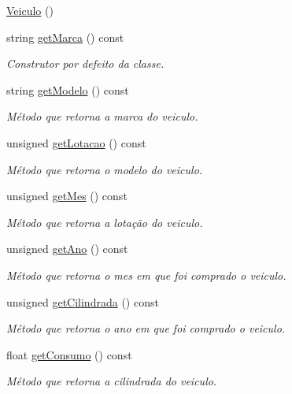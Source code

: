 \begin{DoxyCompactItemize}
\item 
\hyperlink{class_veiculo_aafab27708a2639bc83a4c3721e57d196}{Veiculo} ()
\item 
string \hyperlink{class_veiculo_a2a9d144f41694ea56a33f20a1c97f80b}{get\+Marca} () const 
\begin{DoxyCompactList}\small\item\em Construtor por defeito da classe. \end{DoxyCompactList}\item 
string \hyperlink{class_veiculo_a96eb5720c0be78eb8ed7023904c6b1be}{get\+Modelo} () const 
\begin{DoxyCompactList}\small\item\em Método que retorna a marca do veiculo. \end{DoxyCompactList}\item 
unsigned \hyperlink{class_veiculo_aaebc59082f462ee46de233311281aef2}{get\+Lotacao} () const 
\begin{DoxyCompactList}\small\item\em Método que retorna o modelo do veiculo. \end{DoxyCompactList}\item 
unsigned \hyperlink{class_veiculo_a9cd8a208e3a1dbf1ba02281f1e97f99c}{get\+Mes} () const 
\begin{DoxyCompactList}\small\item\em Método que retorna a lotação do veiculo. \end{DoxyCompactList}\item 
unsigned \hyperlink{class_veiculo_af86f9122ce46d301c58e6247c641ff7b}{get\+Ano} () const 
\begin{DoxyCompactList}\small\item\em Método que retorna o mes em que foi comprado o veiculo. \end{DoxyCompactList}\item 
unsigned \hyperlink{class_veiculo_a03fe5c5380da49cdc25014bf90934263}{get\+Cilindrada} () const 
\begin{DoxyCompactList}\small\item\em Método que retorna o ano em que foi comprado o veiculo. \end{DoxyCompactList}\item 
float \hyperlink{class_veiculo_ad40e432b47edddbdff461d4b44a4cb14}{get\+Consumo} () const 
\begin{DoxyCompactList}\small\item\em Método que retorna a cilindrada do veiculo. \end{DoxyCompactList}\item 

\end{DoxyCompactItemize}

